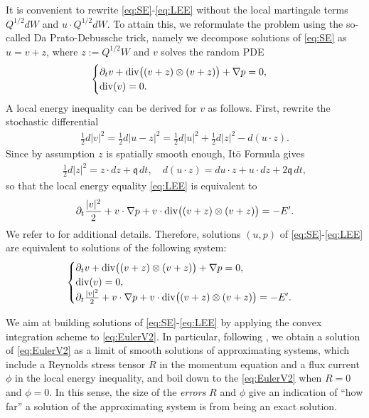 \documentclass[10pt,a4paper]{amsart}
\numberwithin{equation}{section}
\numberwithin{corollario}{section}
\numberwithin{lemma}{section}
\numberwithin{prop}{section}
\theoremstyle{definition}
\theoremstyle{remark}
\newcommand{\dvg}{\mathord{{\rm div}}}
\begin{document}
It is convenient to rewrite \eqref{eq:SE}-\eqref{eq:LEE} without the local martingale terms $Q^{1/2} dW$ and $u \cdot Q^{1/2} dW$. To attain this, we reformulate the problem using the so-called Da Prato-Debussche trick, namely we decompose solutions of \eqref{eq:SE} as $u=v+z$, where $z:=Q^{1/2}W$ and $v$ solves the random PDE
\begin{align}\label{eq:EulerV}
\begin{cases}
\partial_t v 
+
\dvg\big((v+z) \otimes (v+z)\big)
+
\nabla p 
=0,
\\
\dvg(v) = 0.
\end{cases}
\end{align}
A local energy inequality can be derived for $v$ as follows. First, rewrite the stochastic differential
\begin{align}
   \frac12  d |v|^2 = \frac12  d |u-z|^2 = \frac12  d|u|^2 + \frac12 d|z|^2 - d ( u \cdot z ).
\end{align} 
Since by assumption $z$ is spatially smooth enough, It\=o Formula gives 
\begin{align}
    \frac12 d|z|^2 = z \cdot dz + \mathfrak{q} \,dt,
    \quad
    d(u\cdot z) = du \cdot z + u \cdot dz + 2\mathfrak{q}\,dt,
\end{align}
so that the local energy equality \eqref{eq:LEE} is equivalent to
\begin{align}
    \partial_t \frac{|v|^2}{2}+v\cdot \nabla p+v \cdot \dvg\big((v+z)\otimes (v+z)\big)=-E'.
\end{align}
We refer to \cite{Ro10} for additional details.
Therefore, solutions $(u,p)$ of \eqref{eq:SE}-\eqref{eq:LEE} are equivalent to solutions of the following system:
\begin{align}\label{eq:EulerV2}
\begin{cases}
\partial_t v+\dvg\big((v+z)\otimes (v+z)\big)+\nabla p=0,
\\
\dvg(v) = 0,
\\
\partial_t\frac{|v|^2}{2}+v\cdot \nabla p+v \cdot\dvg\big((v+z)\otimes (v+z)\big)=-E'.
\end{cases}
\end{align}

 We aim at building solutions of \eqref{eq:SE}-\eqref{eq:LEE} by applying the convex integration scheme to \eqref{eq:EulerV2}. In particular, following \cite{Is22}, we obtain a solution of \eqref{eq:EulerV2} as a limit of smooth solutions of approximating systems, which include a Reynolds stress tensor $R$ in the momentum equation and a flux current $\phi$ in the local energy inequality, and boil down to the \eqref{eq:EulerV2} when $R=0$ and $\phi=0$.
In this sense, the size of the \emph{errors} $R$ and $\phi$ give an indication of ``how far'' a solution of the approximating system is from being an exact solution.
\end{document}
